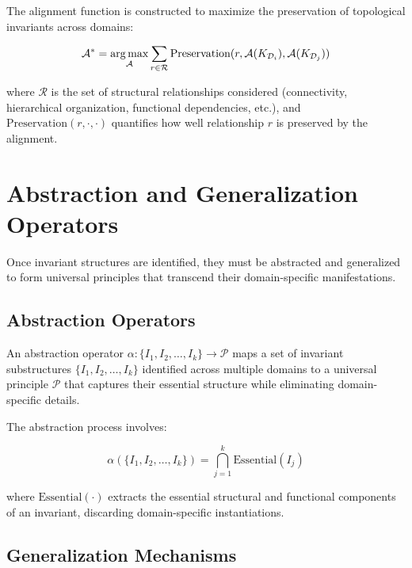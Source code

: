 The alignment function is constructed to maximize the preservation of topological invariants across domains:

\begin{equation}
\mathcal{A}^* = \mathop{\mathrm{arg\,max}}_{\mathcal{A}} \sum_{r \in \mathcal{R}} \text{Preservation}(r, \mathcal{A}(K_{\mathcal{D}_i}), \mathcal{A}(K_{\mathcal{D}_j}))
\end{equation}

where $\mathcal{R}$ is the set of structural relationships considered (connectivity, hierarchical organization, functional dependencies, etc.), and $\text{Preservation}(r, \cdot, \cdot)$ quantifies how well relationship $r$ is preserved by the alignment.

\section{Abstraction and Generalization Operators}

Once invariant structures are identified, they must be abstracted and generalized to form universal principles that transcend their domain-specific manifestations.



\subsection{Abstraction Operators}

\begin{definition}
An abstraction operator $\alpha: \{I_1, I_2, \ldots, I_k\} \rightarrow \mathcal{P}$ maps a set of invariant substructures $\{I_1, I_2, \ldots, I_k\}$ identified across multiple domains to a universal principle $\mathcal{P}$ that captures their essential structure while eliminating domain-specific details.
\end{definition}

The abstraction process involves:

\begin{equation}
\alpha(\{I_1, I_2, \ldots, I_k\}) = \bigcap_{j=1}^{k} \text{Essential}(I_j)
\end{equation}

where $\text{Essential}(\cdot)$ extracts the essential structural and functional components of an invariant, discarding domain-specific instantiations.

\subsection{Generalization Mechanisms}

